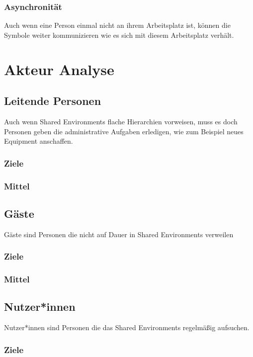 \documentclass{article}
\begin{document}
\subsubsection*{Asynchronität}
Auch wenn eine Person einmal nicht an ihrem Arbeitsplatz ist, können die Symbole weiter kommunizieren wie es sich mit diesem Arbeitsplatz verhält.

\section{Akteur Analyse}


\subsection{Leitende Personen}

Auch wenn Shared Environments flache Hierarchien vorweisen, muss es doch Personen geben die administrative Aufgaben erledigen, wie zum Beispiel neues Equipment anschaffen.

\subsubsection*{Ziele}
\subsubsection*{Mittel}

\subsection{Gäste}

Gäste sind Personen die nicht auf Dauer in Shared Environments verweilen

\subsubsection*{Ziele}
\subsubsection*{Mittel}

\subsection{Nutzer*innen}

Nutzer*innen sind Personen die das Shared Environments regelmäßig aufsuchen.

\subsubsection*{Ziele}
\end{document}

